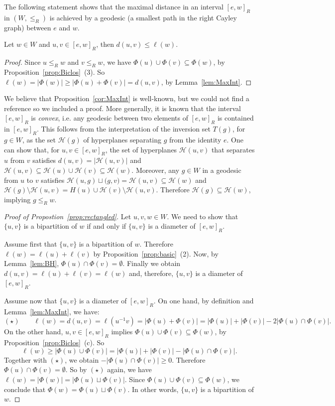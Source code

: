 \documentclass[ALCO,Unicode]{cedram}
\theoremstyle{definition}
\begin{document}
The following statement shows that the maximal distance in an interval $[e,w]_R$ in $(W,\leq_R)$ is achieved by a geodesic (a smallest path in the right Cayley graph) between $e$ and $w$.    

\begin{prop}\label{cor:MaxInt} Let $w\in W$  and $u,v\in [e,w]_R$, then $d(u,v)\leq \ell(w)$. 
\end{prop}
\begin{proof} Since $u\leq_R w$ and $v\leq_R w$, we have $\Phi(u)\cup\Phi(v)\subseteq \Phi(w)$, by Proposition~\ref{prop:Biclos}~(3). So 
$\ell(w)=|\Phi(w)|\geq |\Phi(u) + \Phi(v)|=d(u,v)$, by Lemma~\ref{lem:MaxInt}.
\end{proof}

\begin{remark} We believe that Proposition~\ref{cor:MaxInt} is well-known, but we could not find a reference so we included a proof. More generally, it is known that the interval $[e,w]_R$ is {\em convex}, i.e. any geodesic between two elements of $[e,w]_R$ is contained in  $[e,w]_R$. This follows from the interpretation of the inversion set $T(g)$, for $g\in W$,  as the set $\mathcal H(g)$ of hyperplanes separating $g$ from the identity $e$. One can show that, for  $u,v\in [e,w]_R$, the set of hyperplanes $\mathcal H(u,v)$ that separates $u$ from $v$ satisfies $d(u,v)=|\mathcal H(u,v)|$ and   $\mathcal H(u,v)\subseteq \mathcal H(u)\cup \mathcal H(v)\subseteq \mathcal H (w)$. Moreover, any $g\in W$ in a geodesic from $u$ to $v$ satisfies $\mathcal H(u,g) \sqcup \mathcal (g,v) =\mathcal H(u,v)\subseteq \mathcal H(w)$ and $\mathcal H(g)\setminus \mathcal H(u,v)= H(u)\cup \mathcal H(v)\setminus \mathcal H(u,v)$. Therefore $\mathcal H(g)\subseteq \mathcal H (w)$, implying $g\leq_R w$.
\end{remark}

\begin{proof}[Proof of Propostion~\ref{prop:rectangled}] Let $u,v,w\in W$. We need to show that $\{u,v\}$ is a bipartition of $w$ if and only if $\{u,v\}$ is a diameter of $[e,w]_R$. 

Assume first that $\{u,v\}$ is a bipartition of $w$. Therefore $\ell(w)=\ell(u)+\ell(v)$ by Proposition~\ref{prop:basic}~(2). Now, by Lemma~\ref{lem:BH}, $\Phi(u)\cap \Phi(v)=\emptyset$. Finally we obtain $d(u,v)=\ell(u)+\ell(v)=\ell(w)$ and, therefore, $\{u,v\}$ is a diameter of $[e,w]_R$. 

Assume now that $\{u,v\}$ is a diameter of $[e,w]_R$. On one hand, by definition and Lemma~\ref{lem:MaxInt}, we have:
$$
(\star)\qquad \ell(w)=d(u,v)=\ell(u^{-1}v)=|\Phi(u)+\Phi(v)|=|\Phi(u)|+|\Phi(v)|-2|\Phi(u)\cap\Phi(v)|.
$$  
On the other hand, $u,v\in [e,w]_R$ implies $\Phi(u)\cup\Phi(v)\subseteq \Phi(w)$, by Proposition~\ref{prop:Biclos}~(c). So
$$
\ell(w)\geq |\Phi(u)\cup \Phi(v)|=|\Phi(u)|+|\Phi(v)|-|\Phi(u)\cap \Phi(v)|.
$$
Together with $(\star)$, we obtain  $-|\Phi(u)\cap\Phi(v)|\geq 0$. Therefore $\Phi(u)\cap \Phi(v)=\emptyset$. So by $(\star)$ again, we have  $\ell(w) = |\Phi(w)|=|\Phi(u)\sqcup\Phi(v)|$. Since $\Phi(u)\cup\Phi(v)\subseteq \Phi(w)$, we conclude that $\Phi(w)=\Phi(u)\sqcup\Phi(v)$. In other words,  $\{u,v\}$ is a bipartition of $w$. 
 \end{proof}
\end{document}
